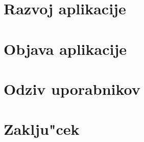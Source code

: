 \documentclass[a4paper, 12pt]{article}
\begin{document}
	\section{Razvoj aplikacije}
	
	
	\section{Objava aplikacije}
	
	
	\section{Odziv uporabnikov}
	
	
	\section{Zaklju"cek}
	
	
	\printbibliography[heading=bibintoc]
	
\end{document}
